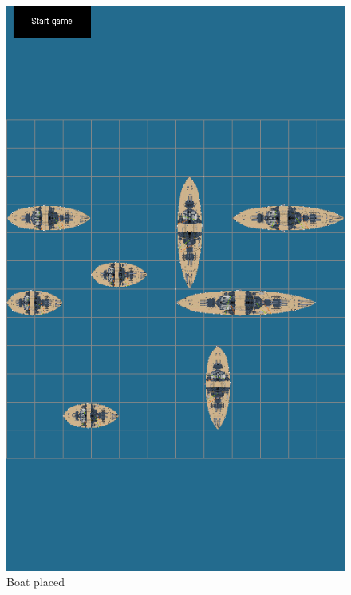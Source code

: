 \begin{figure}[ht]
	\begin{minipage}[b]{0.325\linewidth}
		\centering
		\includegraphics[scale=0.225]{img/Screenshot_placed.png}
		\caption{Boat placed}
		\label{fig:placed}
	\end{minipage}
	\begin{minipage}[b]{0.325\linewidth}
		\centering

\end{minipage}
\end{figure}
